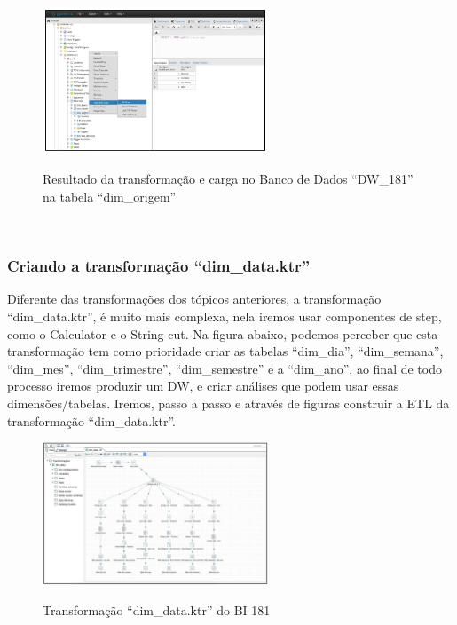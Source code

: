 \begin{figure}[H]
	\vspace*{0,2cm}
    \centering
    \caption{Resultado da transforma\c{c}\~{a}o e carga no Banco de Dados ``DW\_181'' na tabela ``dim\_origem''}
    \includegraphics[width=0.6\textwidth]{./04-figuras/figura-res-dim-origem}
    \label{fig:ilustfigresdimorigem}
\end{figure}
\vspace*{-0,9cm}
{\raggedright {}} \\

\subsubsection{Criando a transforma\c{c}\~{a}o ``dim\_data.ktr''}

Diferente das transforma\c{c}\~{o}es dos t\'{o}picos anteriores, a transforma\c{c}\~{a}o ``dim\_data.ktr'', 
\'{e} muito mais complexa, nela iremos usar componentes de step, como o Calculator e o String cut. 
Na figura abaixo, podemos perceber que esta transforma\c{c}\~{a}o tem como prioridade criar 
as tabelas ``dim\_dia'', ``dim\_semana'', ``dim\_mes'', ``dim\_trimestre'', ``dim\_semestre'' e 
a ``dim\_ano'', ao final de todo processo iremos produzir um DW, e criar an\'{a}lises que podem 
usar essas dimens\~{o}es/tabelas.
Iremos, passo a passo e atrav\'{e}s de figuras construir a ETL da transforma\c{c}\~{a}o ``dim\_data.ktr''.

\begin{figure}[H]
	\vspace*{0,2cm}
    \centering
    \caption{Transforma\c{c}\~{a}o ``dim\_data.ktr'' do BI 181}
    \includegraphics[width=0.6\textwidth]{./04-figuras/figura-dim-data}
    \label{fig:ilustfigresdimdata}
\end{figure}
\vspace*{-0,9cm}
{\raggedright {}} \\

